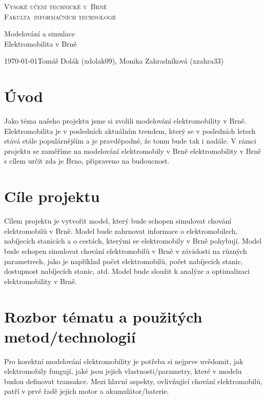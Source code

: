 \documentclass[a4paper,11pt]{article}
\begin{document}
\begin{titlepage}
    \begin{center}
        
        \Huge
        \textsc{Vysoké učení technické v~Brně}\\[0.1em]
        
        \huge
        \textsc{Fakulta~informačních technologií}
        
        
        \LARGE
        Modelování a simulace \\
        Elektromobilita v Brně

    \end{center}
    
    {\large \today \hfill Tomáš Dolák (xdolak09), Monika Zahradníková (xzahra33)}
\end{titlepage}

\newpage
\tableofcontents

\newpage
\label{firstpage}

\section{Úvod}
Jako téma našeho projektu jsme si zvolili modelování elektromobility v Brně. Elektromobilita je v posledních aktuálním trendem, 
který se v posledních letech stává stále populárnějším a je pravděpodné, že tomu bude tak i nadále. 
V rámci projektu se zaměříme na modelování elektromobily v Brně elektromobility v Brně s cílem určit zda je Brno, připraveno 
na budoucnost.\cite{simlib_cpp}

\section{Cíle projektu}
Cílem projektu je vytvořit model, který bude schopen simulovat chování elektromobilů v Brně. 
Model bude zahrnovat informace o elektromobilech, nabíjecích stanicích a o cestách, kterými 
se elektromobily v Brně pohybují. Model bude schopen simulovat chování elektromobilů v Brně 
v závislosti na různých parametrech, jako je například počet elektromobilů, počet nabíjecích 
stanic, dostupnost nabíjecích stanic, atd. Model bude sloužit k analýze a optimalizaci 
elektromobility v Brně.

\section{Rozbor tématu a použitých metod/technologií}
Pro korektní modelování elektromobility je potřeba si nejprve uvědomit, jak elektromobily fungují, 
jaké jsou jejich vlastnosti/parametry, které v modelu budou definovat transakce. Mezi hlavní aspekty,
ovlivňující chování elektromobilů, patří v prvé řadě jejich motor a akumulátor/baterie.
\end{document}
